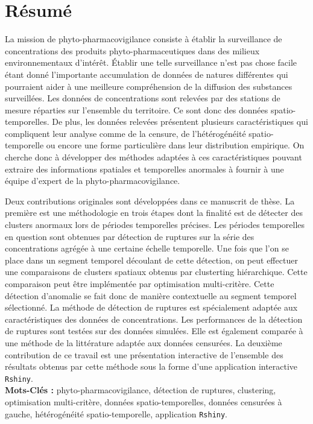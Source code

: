 \section*{Résumé}

La mission de phyto-pharmacovigilance consiste à établir la surveillance de concentrations des produits phyto-pharmaceutiques dans des milieux environnementaux d'intérêt. Établir une telle surveillance n'est pas chose facile étant donné l'importante accumulation de données de natures différentes qui pourraient aider à une meilleure compréhension de la diffusion des substances surveillées. Les données de concentrations sont relevées par des stations de mesure réparties sur l'ensemble du territoire. Ce sont donc des données spatio-temporelles. De plus, les données relevées présentent plusieurs caractéristiques qui compliquent leur analyse comme de la censure, de l'hétérogénéité spatio-temporelle ou encore une forme particulière dans leur distribution empirique. On cherche donc à développer des méthodes adaptées à ces caractéristiques pouvant extraire des informations spatiales et temporelles anormales à fournir à une équipe d'expert de la phyto-pharmacovigilance.       

Deux contributions originales sont développées dans ce manuscrit de thèse. La première est une méthodologie en trois étapes dont la finalité est de détecter des clusters anormaux lors de périodes temporelles précises. Les périodes temporelles en question sont obtenues par détection de ruptures sur la série des concentrations agrégée à une certaine échelle temporelle. Une fois que l'on se place dans un segment temporel découlant de cette détection, on peut effectuer une comparaisons de clusters spatiaux obtenus par clusterting hiérarchique. Cette comparaison peut être implémentée par optimisation multi-critère. Cette détection d'anomalie se fait donc de manière contextuelle au segment temporel sélectionné. La méthode de détection de ruptures est spécialement adaptée aux caractéristiques des données de concentrations. Les performances de la détection de ruptures sont testées sur des données simulées. Elle est également comparée à une méthode de la littérature adaptée aux données censurées. La deuxième contribution de ce travail est une présentation interactive de l'ensemble des résultats obtenus par cette méthode sous la forme d'une application interactive \texttt{Rshiny}.  \\

\textbf{Mots-Clés :} phyto-pharmacovigilance, détection de ruptures, clustering, optimisation multi-critère, données spatio-temporelles, données censurées à gauche, hétérogénéité spatio-temporelle, application \texttt{Rshiny}.